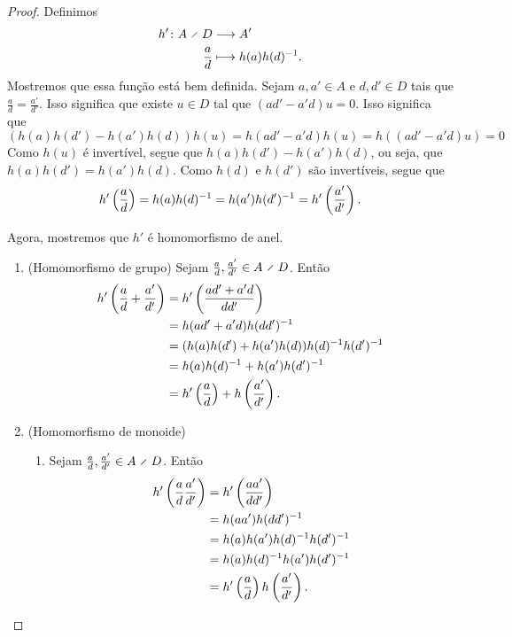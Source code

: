 \begin{proof} Definimos
	\begin{align*}
	\func{h'}{A \olddiv D}{A'}{\frac{a}{d}}{h(a)h(d)\inv}.
	\end{align*}
Mostremos que essa função está bem definida. Sejam $a,a' \in A$ e $d,d' \in D$ tais que $\frac{a}{d} = \frac{a'}{d'}$. Isso significa que existe $u \in D$ tal que $(ad'-a'd)u = 0$. Isso significa que
	\begin{equation*}
	(h(a)h(d')-h(a')h(d)) h(u) = h(ad'-a'd)h(u) = h((ad'-a'd)u) = 0
	\end{equation*}
Como $h(u)$ é invertível, segue que $h(a)h(d')-h(a')h(d)$, ou seja, que $h(a)h(d') = h(a')h(d)$. Como $h(d)$ e $h(d')$ são invertíveis, segue que
	\begin{equation*}
	h'\left( \frac{a}{d} \right) = h(a)h(d)^{-1} = h(a')h(d')^{-1} = h'\left( \frac{a'}{d'} \right).
	\end{equation*}

Agora, mostremos que $h'$ é homomorfismo de anel.
	\begin{enumerate}
	\item (Homomorfismo de grupo) Sejam $\frac{a}{d},\frac{a'}{d'} \in A \olddiv D$. Então
		\begin{align*}
		h' \left( \frac{a}{d} + \frac{a'}{d'} \right) &= h' \left( \frac{ad'+a'd}{dd'} \right) \\
			&= h(ad'+a'd)h(dd')^{-1} \\
			&= (h(a)h(d')+h(a')h(d)) h(d)^{-1} h(d')^{-1} \\
			&= h(a)h(d)^{-1} + h(a')h(d')^{-1} \\
			&= h' \left( \frac{a}{d} \right) + h \left( \frac{a'}{d'} \right).
		\end{align*}

	\item (Homomorfismo de monoide)
		\begin{enumerate}
		\item Sejam $\frac{a}{d},\frac{a'}{d'} \in A \olddiv D$. Então
		\begin{align*}
		h' \left( \frac{a}{d}\frac{a'}{d'} \right) &= h' \left( \frac{aa'}{dd'} \right) \\
			&= h(aa')h(dd')^{-1} \\
			&= h(a)h(a')h(d)^{-1} h(d')^{-1} \\
			&= h(a)h(d)^{-1} h(a')h(d')^{-1} \\
			&= h' \left( \frac{a}{d} \right) h \left( \frac{a'}{d'} \right).
		\end{align*}


\end{enumerate}
\end{enumerate}
\end{proof}

